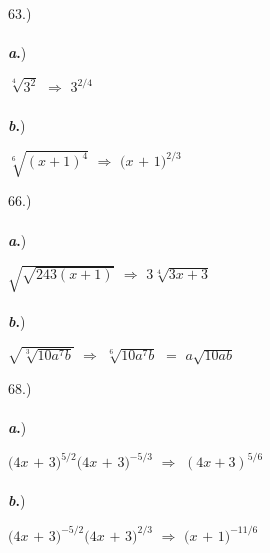 \documentclass[12pt]{article}
\begin{document}
{\setlength{\parindent}{0cm}
63.) 
    \paragraph{} \textbf{\textit{a}.})
        \begin{center} $\sqrt[4]{3^2}$ $\Longrightarrow$ $3^{2/4}$ \end{center} 
    \paragraph{} \textbf{\textit{b}.})
        \begin{center} $\sqrt[6]{(x+1)^4}$ $\Longrightarrow$ $(x$ $+$ $1)^{2/3}$ \end{center} 
}
{\setlength{\parindent}{0cm}
66.) 
    \paragraph{} \textbf{\textit{a}.})
        \begin{center} $\sqrt{\sqrt{243(x+1)}}$ $\Longrightarrow$ $3\sqrt[4]{3x+3}$ \end{center} 
    \paragraph{} \textbf{\textit{b}.})
        \begin{center} $\sqrt{\sqrt[3]{10a^7b}}$ $\Longrightarrow$ $\sqrt[6]{10a^7b}$ $=$ $a\sqrt{10ab}$ \end{center} 
}
{\setlength{\parindent}{0cm}
68.) 
    \paragraph{} \textbf{\textit{a}.})
        \begin{center} $(4x$ $+$ $3)^{5/2}(4x$ $+$ $3)^{-5/3}$ $\Longrightarrow$ $(4x+3)^{5/6}$ \end{center} 
    \paragraph{} \textbf{\textit{b}.})
        \begin{center} $(4x$ $+$ $3)^{-5/2}(4x$ $+$ $3)^{2/3}$ $\Longrightarrow$ $(x$ $+$ $1)^{-11/6}$ \end{center} 
}
\end{document}
